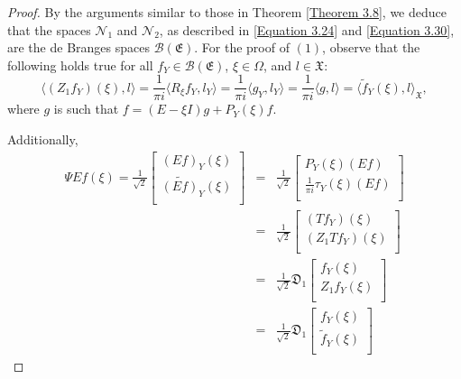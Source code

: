 \documentclass [12pt,reqno]{amsart}
\numberwithin{equation}{subsection}
\numberwithin{equation}{section}
\begin{document}
\begin{proof}
By the arguments similar to those in Theorem \ref{Theorem 3.8}, we deduce that the spaces \( \mathcal{N}_1 \) and \( \mathcal{N}_2 \), as described in \eqref{Equation 3.24} and \eqref{Equation 3.30}, are the de Branges spaces \( \mathcal{B}(\mathfrak{E}) \). For the proof of $(1)$, observe that the following holds true for all \( f_Y \in \mathcal{B}(\mathfrak{E}) \), \( \xi \in \Omega \), and \( l \in \mathfrak{X} \): 
\[
\langle (Z_1 f_Y)(\xi), l \rangle = \frac{1}{\pi i}\langle R_{\xi} f_Y, l_Y \rangle = \frac{1}{\pi i}\langle g_Y, l_Y \rangle =\frac{1}{\pi i} \langle g, l \rangle = \langle \tilde{f}_Y(\xi), l \rangle_{\mathfrak{X}},  
\]  
where $g$ is such that $f = (E - \xi I)g + P_Y(\xi)f$. 

Additionally,
\begin{eqnarray*}
\Psi Ef(\xi) = \frac{1}{\sqrt{2}}
                    \begin{bmatrix} 
                       	(Ef)_Y(\xi)  \\
                    	\tilde{(Ef)}_Y(\xi) \\
                    	\end{bmatrix}
               &=&  \frac{1}{\sqrt{2}} \begin{bmatrix} 
	                   P_{Y}(\xi)(Ef)  \\   	                      \frac{1}{\pi i} \tau_{Y}(\xi)(Ef) \\
                	\end{bmatrix}	\\
                	&=&  \frac{1}{\sqrt{2}} \begin{bmatrix} 
	                   (Tf_{Y})(\xi) \\   	                                                (Z_1Tf_{Y})(\xi) \\
                	\end{bmatrix}	\\
                	&=&\frac{1}{\sqrt{2}} \mathfrak{D}_1                                  \begin{bmatrix} 
                       	f_Y(\xi)  \\
                    	Z_1f_Y(\xi) \\
                    	\end{bmatrix} \\                   
                	&=& \frac{1}{\sqrt{2}}\mathfrak{D}_1 
\begin{bmatrix}
	                 f_{Y}(\xi)  \\   	                                                \tilde{f}_{Y}(\xi) \\

\end{bmatrix}
\end{eqnarray*}
\end{proof}
\end{document}
